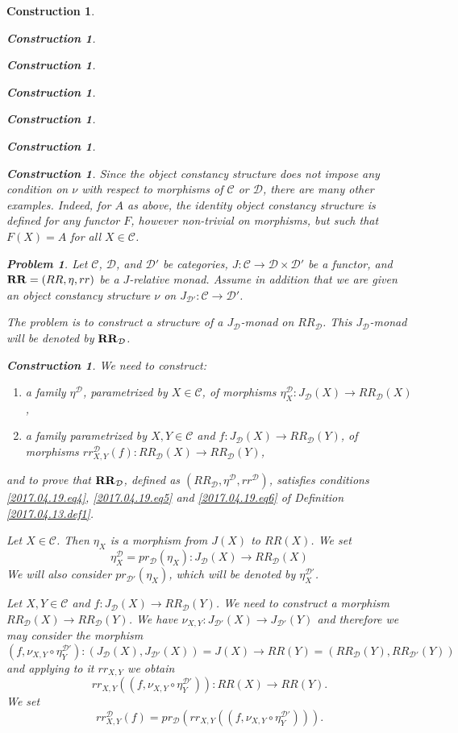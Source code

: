 \documentclass[onecolumn,12pt]{amsart}
\numberwithin{proposition}{subsection}
\newtheorem{problem}[proposition]{Problem}
\newtheorem{construction}[proposition]{Construction}
\newcommand{\sr}{\rightarrow}
\newcommand{\RR}{{\bf RR}}
\newcommand{\C}{{\mathcal C}}
\newcommand{\D}{{\mathcal D}}
\begin{document}
\begin{construction}
\begin{construction}
\begin{construction}
\begin{construction}
\begin{construction}
\begin{construction}
\begin{construction}
Since the object constancy structure does not impose any condition on $\nu$
with respect to morphisms of $\C$ or $\D$, there are many other
examples. Indeed, for $A$ as above, the identity object constancy structure is
defined for any functor $F$, however non-trivial on morphisms, but such that
$F(X)=A$ for all $X\in\C$.
%
\begin{problem}
\label{2017.04.21.prob1}
Let $\C$, $\D$, and $\D'$ be categories, $J:\C\sr \D\times\D'$ be a functor, and
$\RR=(RR,\eta,rr)$ be a $J$-relative monad. Assume in addition that we are given
an object constancy structure $\nu$ on $J_{\D'}:\C\sr\D'$.

The problem is to construct a structure of a $J_{\D}$-monad on $RR_{\D}$. This $J_{\D}$-monad will be denoted by $\RR_{\D}$.
\end{problem}
%
\begin{construction}\rm
\label{2017.04.21.constr1}
We need to construct:
%
\begin{enumerate}
\item a family $\eta^{\D}$, parametrized by $X\in\C$, of morphisms $\eta^{\D}_X:J_{\D}(X)\sr RR_{\D}(X)$,
\item a family parametrized by $X,Y\in\C$ and $f:J_{\D}(X)\sr RR_{\D}(Y)$, of morphisms $rr^{\D}_{X,Y}(f):RR_{\D}(X)\sr RR_{\D}(Y)$,
\end{enumerate}
%
and to prove that $\RR_{\D}$, defined as $(RR_{\D},\eta^{\D},rr^{\D})$,
satisfies conditions \ref{2017.04.19.eq4}, \ref{2017.04.19.eq5} and
\ref{2017.04.19.eq6} of Definition \ref{2017.04.13.def1}.

Let $X\in\C$. Then $\eta_X$ is a morphism from $J(X)$ to $RR(X)$. We set 
%
\begin{equation}
\label{2017.04.21.eq1}
\eta^{\D}_X=pr_{\D}(\eta_X):J_{\D}(X)\sr RR_{\D}(X)
\end{equation}%
%
We will also consider $pr_{\D'}(\eta_X)$, which will be denoted by $\eta^{\D'}_X$. 

Let $X,Y\in\C$ and $f:J_{\D}(X)\sr RR_{\D}(Y)$. We need to construct a morphism
$RR_{\D}(X)\sr RR_{\D}(Y)$. We have $\nu_{X,Y}:J_{\D'}(X)\sr J_{\D'}(Y)$ and
therefore we may consider the morphism
%
$$(f,\nu_{X,Y}\circ \eta^{\D'}_Y):(J_{\D}(X),J_{\D'}(X))=J(X)\sr RR(Y)=(RR_{\D}(Y),RR_{\D'}(Y))$$
%
and applying to it $rr_{X,Y}$ we obtain 
%
$$rr_{X,Y}((f,\nu_{X,Y}\circ \eta^{\D'}_Y)):RR(X)\sr RR(Y).$$
%
We set
%
\begin{equation}
\label{2017.04.21.eq2}
rr^{\D}_{X,Y}(f)=pr_{\D}(rr_{X,Y}((f,\nu_{X,Y}\circ \eta^{\D'}_Y))).
\end{equation}%
%


\end{construction}
\end{construction}
\end{construction}
\end{construction}
\end{construction}
\end{construction}
\end{construction}
\end{construction}
\end{document}
